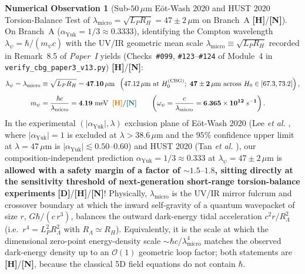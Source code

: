 \documentclass[11pt,a4paper]{article}
\newcommand{\catD}{\textbf{\textcolor{blue!75!black}{[D]}}}
\newcommand{\catH}{\textbf{\textcolor{orange!85!black}{[H]}}}
\newcommand{\catN}{\textbf{\textcolor{teal!75!black}{[N]}}}
\theoremstyle{plain}
\theoremstyle{definition}
\newtheorem{observation}[theorem]{Numerical Observation}
\theoremstyle{remark}
\numberwithin{equation}{section}
\begin{document}
\begin{observation}[Sub-$50\,\mu\text{m}$ E\"ot-Wash 2020 and HUST 2020 Torsion-Balance Test of $\lambda_{\text{micro}} = \sqrt{L_P R_H} = 47 \pm 2\,\mu\text{m}$ on Branch~A \catH/\catN]
\label{obs:eotwash_47um_test}
On Branch~A ($\alpha_{\text{Yuk}} = 1/3 \approx 0.3333$), identifying the Compton wavelength $\lambda_{\psi} = \hbar/(m_{\psi}c)$ with the UV/IR geometric mean scale $\lambda_{\text{micro}} \equiv \sqrt{L_P R_H}$ recorded in Remark~8.5 of \textit{Paper~I} \cite{jimenez2026a} yields (Checks~\texttt{\#099}, \texttt{\#123}--\texttt{\#124} of Module~4 in \allowbreak\texttt{verify\_cbg\_paper3\_v13.py}) \catH/\catN:
\begin{align}
  \lambda_{\psi} = \lambda_{\text{micro}} &\equiv \sqrt{L_P R_H} = \mathbf{47.10\,\mu\text{m}} \;\;\left(47.12\,\mu\text{m}\text{ at }H_0^{\text{(CBG)}}; \;\mathbf{47 \pm 2\,\mu\text{m}}\text{ across } H_0 \in [67.3, 73.2]\right), \nonumber \\[3pt]
  m_{\psi} &= \frac{\hbar c}{\lambda_{\text{micro}}} = \mathbf{4.19\text{ meV}} \;\;\catH/\catN \qquad \left(\omega_{\psi} = \frac{c}{\lambda_{\text{micro}}} = \mathbf{6.365 \times 10^{12}\text{ s}^{-1}}\right).
  \label{eq:lambda_micro_eotwash_test}
\end{align}
In the experimental $(|\alpha_{\text{Yuk}}|, \lambda)$ exclusion plane of E\"ot-Wash 2020 (Lee \textit{et al.} \cite{lee2020}, where $|\alpha_{\text{Yuk}}| = 1$ is excluded at $\lambda > 38.6\,\mu\text{m}$ and the $95\%$ confidence upper limit at $\lambda = 47\,\mu\text{m}$ is $|\alpha_{\text{Yuk}}| \lesssim 0.50\text{--}0.60$) and HUST 2020 (Tan \textit{et al.} \cite{tan2020_hust}), our composition-independent prediction $\alpha_{\text{Yuk}} = 1/3 \approx 0.333$ at $\lambda_{\psi} = 47 \pm 2\,\mu\text{m}$ is \textbf{allowed with a safety margin of a factor of $\sim 1.5\text{--}1.8$, sitting directly at the sensitivity threshold of next-generation short-range torsion-balance experiments} \cite{lee2020,tan2020_hust} \catD/\catH/\catN! Physically, $\lambda_{\text{micro}}$ is the UV/IR mirror fulcrum and crossover boundary at which the inward self-gravity of a quantum wavepacket of size $r$, $G\hbar/(c\,r^3)$, balances the outward dark-energy tidal acceleration $c^2 r/R_{\Lambda}^2$ (i.e.\ $r^4 = L_P^2 R_{\Lambda}^2$ with $R_{\Lambda} \simeq R_H$). Equivalently, it is the scale at which the dimensional zero-point energy-density scale $\sim \hbar c/\lambda_{\text{micro}}^4$ matches the observed dark-energy density up to an $\mathcal{O}(1)$ geometric loop factor; both statements are \catH/\catN, because the classical 5D field equations do not contain $\hbar$.
\end{observation}
\end{document}
